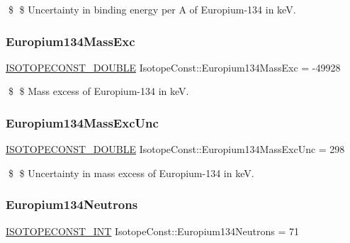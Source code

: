 \$ \$ Uncertainty in binding energy per A of Europium-\/134 in keV. \mbox{\label{group___isotope_const-_europium-_eu134_gae83ab72e19d14e6cd2247b7962b9a837}} 
\subsubsection{\texorpdfstring{Europium134\+Mass\+Exc}{Europium134MassExc}}
{\footnotesize\ttfamily \mbox{\hyperlink{group___isotope_const-_macros_ga8f45a7272ce02c0b4c65c44636ed719a}{I\+S\+O\+T\+O\+P\+E\+C\+O\+N\+S\+T\+\_\+\+D\+O\+U\+B\+LE}} Isotope\+Const\+::\+Europium134\+Mass\+Exc = -\/49928}

\$ \$ Mass excess of Europium-\/134 in keV. \mbox{\label{group___isotope_const-_europium-_eu134_ga2dfc2b931e5b87722a5f2d9bf8325ae5}} 
\subsubsection{\texorpdfstring{Europium134\+Mass\+Exc\+Unc}{Europium134MassExcUnc}}
{\footnotesize\ttfamily \mbox{\hyperlink{group___isotope_const-_macros_ga8f45a7272ce02c0b4c65c44636ed719a}{I\+S\+O\+T\+O\+P\+E\+C\+O\+N\+S\+T\+\_\+\+D\+O\+U\+B\+LE}} Isotope\+Const\+::\+Europium134\+Mass\+Exc\+Unc = 298}

\$ \$ Uncertainty in mass excess of Europium-\/134 in keV. \mbox{\label{group___isotope_const-_europium-_eu134_ga4f468e7ff194361d28b01a1bf0b5f356}} 
\subsubsection{\texorpdfstring{Europium134\+Neutrons}{Europium134Neutrons}}
{\footnotesize\ttfamily \mbox{\hyperlink{group___isotope_const-_macros_ga5f18360b3e99483a35c32d789e62621c}{I\+S\+O\+T\+O\+P\+E\+C\+O\+N\+S\+T\+\_\+\+I\+NT}} Isotope\+Const\+::\+Europium134\+Neutrons = 71}

